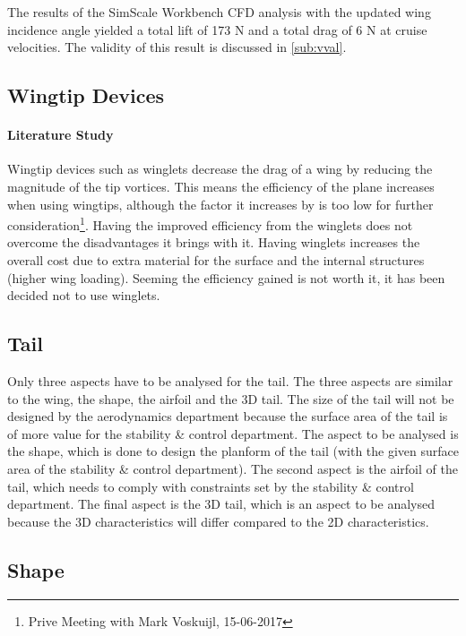 The results of the SimScale Workbench CFD analysis with the updated wing incidence angle yielded a total lift of 173 N and a total drag of 6 N at cruise velocities. The validity of this result is discussed in \autoref{sub:vval}.

\subsection*{Wingtip Devices}

\paragraph{Literature Study} Wingtip devices such as winglets decrease the drag of a wing by reducing the magnitude of the tip vortices. This means the efficiency of the plane increases when using wingtips, although the factor it increases by is too low for further consideration\footnote{Prive Meeting with Mark Voskuijl, 15-06-2017}. Having the improved efficiency from the winglets does not overcome the disadvantages it brings with it. Having winglets increases the overall cost due to extra material for the surface and the internal structures (higher wing loading). Seeming the efficiency gained is not worth it, it has been decided not to use winglets.

\subsection{Tail}
\label{sec:aero_tail}

Only three aspects have to be analysed for the tail. The three aspects are similar to the wing, the shape, the airfoil and the 3D tail. The size of the tail will not be designed by the aerodynamics department because the surface area of the tail is of more value for the stability \& control department. The aspect to be analysed is the shape, which is done to design the planform of the tail (with the given surface area of the stability \& control department). The second aspect is the airfoil of the tail, which needs to comply with constraints set by the stability \& control department. The final aspect is the 3D tail, which is an aspect to be analysed because the 3D characteristics will differ compared to the 2D characteristics.

\subsection*{Shape}

